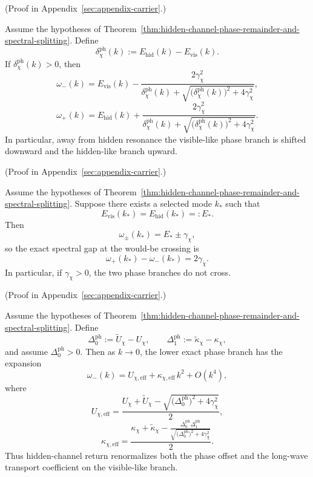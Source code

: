 (Proof in Appendix~\ref{sec:appendix-carrier}.)

\begin{corollary}
\label{cor:exact-off-resonant-phase-line-shifts}
Assume the hypotheses of
Theorem~\ref{thm:hidden-channel-phase-remainder-and-spectral-splitting}. Define
\[
\delta_{\chi}^{\mathrm{ph}}(k):=E_{\mathrm{hid}}(k)-E_{\mathrm{vis}}(k).
\]
If \(\delta_{\chi}^{\mathrm{ph}}(k)>0\), then
\[
\omega_-(k)
=
E_{\mathrm{vis}}(k)
-
\frac{
2\gamma_{\chi}^2
}{
\delta_{\chi}^{\mathrm{ph}}(k)
+
\sqrt{
\bigl(\delta_{\chi}^{\mathrm{ph}}(k)\bigr)^2+4\gamma_{\chi}^2
}
},
\]
\[
\omega_+(k)
=
E_{\mathrm{hid}}(k)
+
\frac{
2\gamma_{\chi}^2
}{
\delta_{\chi}^{\mathrm{ph}}(k)
+
\sqrt{
\bigl(\delta_{\chi}^{\mathrm{ph}}(k)\bigr)^2+4\gamma_{\chi}^2
}
}.
\]
In particular, away from hidden resonance the visible-like phase branch is
shifted downward and the hidden-like branch upward.
\end{corollary}

(Proof in Appendix~\ref{sec:appendix-carrier}.)

\begin{corollary}
\label{cor:exact-avoided-crossing-coupled-phase-branches}
Assume the hypotheses of
Theorem~\ref{thm:hidden-channel-phase-remainder-and-spectral-splitting}. Suppose
there exists a selected mode \(k_\ast\) such that
\[
E_{\mathrm{vis}}(k_\ast)=E_{\mathrm{hid}}(k_\ast)=:E_\ast.
\]
Then
\[
\omega_{\pm}(k_\ast)=E_\ast\pm\gamma_{\chi},
\]
so the exact spectral gap at the would-be crossing is
\[
\omega_+(k_\ast)-\omega_-(k_\ast)=2\gamma_{\chi}.
\]
In particular, if \(\gamma_{\chi}>0\), the two phase branches do not cross.
\end{corollary}

(Proof in Appendix~\ref{sec:appendix-carrier}.)

\begin{corollary}
\label{cor:low-energy-renormalized-phase-offset-and-transport-coefficient}
Assume the hypotheses of
Theorem~\ref{thm:hidden-channel-phase-remainder-and-spectral-splitting}. Define
\[
\Delta_0^{\mathrm{ph}}:=\widetilde U_{\chi}-U_{\chi},
\qquad
\Delta_1^{\mathrm{ph}}:=\widetilde\kappa_{\chi}-\kappa_{\chi},
\]
and assume \(\Delta_0^{\mathrm{ph}}>0\). Then as \(k\to 0\), the lower exact
phase branch has the expansion
\[
\omega_-(k)
=
U_{\chi,\mathrm{eff}}
+
\kappa_{\chi,\mathrm{eff}}\,k^2
+
O(k^4),
\]
where
\[
U_{\chi,\mathrm{eff}}
=
\frac{
U_{\chi}+\widetilde U_{\chi}
-
\sqrt{
\bigl(\Delta_0^{\mathrm{ph}}\bigr)^2+4\gamma_{\chi}^2
}
}{2},
\]
\[
\kappa_{\chi,\mathrm{eff}}
=
\frac{
\kappa_{\chi}+\widetilde\kappa_{\chi}
-
\frac{
\Delta_0^{\mathrm{ph}}\Delta_1^{\mathrm{ph}}
}{
\sqrt{
\bigl(\Delta_0^{\mathrm{ph}}\bigr)^2+4\gamma_{\chi}^2
}
}
}{2}.
\]
Thus hidden-channel return renormalizes both the phase offset and the long-wave
transport coefficient on the visible-like branch.
\end{corollary}

